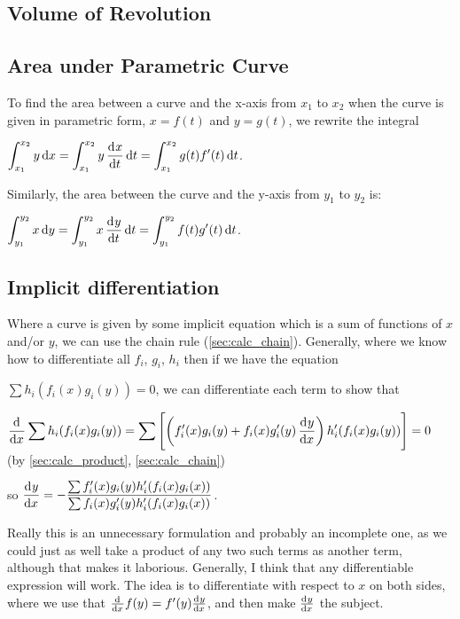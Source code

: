 \documentclass[a4paper,11pt]{article}
\begin{document}
    \subsection{Volume of Revolution}

    \subsection{Area under Parametric Curve} \label{sec:calc_parametric_area}

    To find the area between a curve and the x-axis from $x_1$ to $x_2$ when the
    curve is given in parametric form, $x = f(t)$ and $y = g(t)$, we rewrite the
    integral

    $\displaystyle \int_{x_1}^{x_2} y \dif x =
     \int_{x_1}^{x_2} y \dod xt \dif t = \int_{x_1}^{x_2} g(t)f'(t) \dif t$.

    Similarly, the area between the curve and the y-axis from $y_1$ to $y_2$ is:

    $\displaystyle \int_{y_1}^{y_2} x \dif y =
     \int_{y_1}^{y_2} x \dod yt \dif t = \int_{y_1}^{y_2} f(t)g'(t) \dif t$.

    \subsection{Implicit differentiation}

    Where a curve is given by some implicit equation which is a sum of functions
    of $x$ and/or $y$, we can use the chain rule (\ref{sec:calc_chain}).
    Generally, where we know how to differentiate all $f_i$, $g_i$, $h_i$ then
    if we have the equation

    $\displaystyle \sum h_i(f_i(x)g_i(y)) = 0$, we can differentiate each term
    to show that

    $\displaystyle\dod{}{x} \sum h_i(f_i(x)g_i(y)) =
     \sum \left[\left(f_i'(x)g_i(y) +
                      f_i(x)g_i'(y)\dod yx\right)
                h_i'(f_i(x)g_i(y))\right] = 0$ (by \ref{sec:calc_product},
    \ref{sec:calc_chain})

    so $\displaystyle \dod yx = -\frac{\sum f_i'(x)g_i(y)h_i'(f_i(x)g_i(x))}
                                      {\sum f_i(x)g_i'(y)h_i'(f_i(x)g_i(x))}$.

    Really this is an unnecessary formulation and probably an incomplete one, as
    we could just as well take a product of any two such terms as another term,
    although that makes it laborious. Generally, I think that any differentiable
    expression will work. The idea is to differentiate with respect to $x$ on
    both sides, where we use that $\od{}{x}f(y) = f'(y)\od yx$, and then make
    $\od yx$ the subject.
\end{document}

